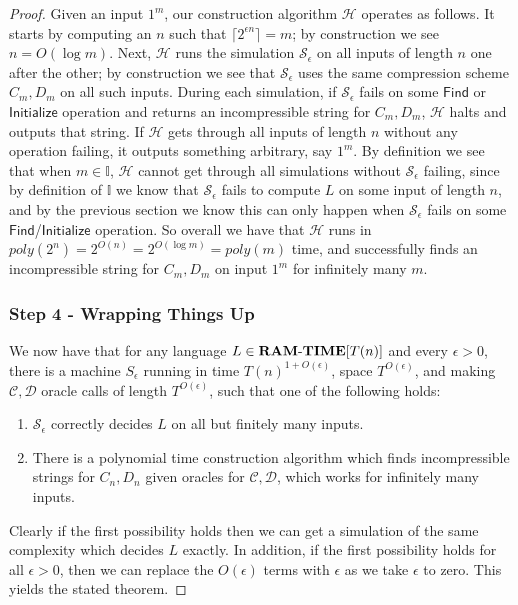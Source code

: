 \documentclass[11pt]{article}
\newcommand{\dash}{\text{-}}
\def\cl{\bf}
\begin{document}
\begin{proof}
Given an input $1^m$, our construction algorithm $\mathcal{H}$ operates as follows. It starts by computing an $n$ such that $\lceil 2^{\epsilon n} \rceil = m$; by construction we see $n = O(\log m)$. Next, $\mathcal{H}$ runs the simulation $\mathcal{S}_{\epsilon}$ on all inputs of length $n$ one after the other; by construction we see that $\mathcal{S}_{\epsilon}$ uses the same compression scheme $C_m,D_m$ on all such inputs. During each simulation, if $\mathcal{S}_{\epsilon}$ fails on some $\mathsf{Find}$ or $\mathsf{Initialize}$ operation and returns an incompressible string for $C_m,D_m$, $\mathcal{H}$ halts and outputs that string. If $\mathcal{H}$ gets through all inputs of length $n$ without any operation failing, it outputs something arbitrary, say $1^m$. By definition we see that when $m \in \mathbb{I}$, $\mathcal{H}$ cannot get through all simulations without $\mathcal{S}_{\epsilon}$ failing, since by definition of $\mathbb{I}$ we know that $\mathcal{S}_{\epsilon}$ fails to compute $L$ on some input of length $n$, and by the previous section we know this can only happen when $\mathcal{S}_{\epsilon}$ fails on some $\mathsf{Find}$/$\mathsf{Initialize}$ operation. So overall we have that $\mathcal{H}$ runs in $poly(2^n) = 2^{O(n)} = 2^{O(\log m)} = poly(m)$ time, and successfully finds an incompressible string for $C_m,D_m$ on input $1^m$ for infinitely many $m$.

\subsubsection*{Step 4 - Wrapping Things Up}
We now have that for any language $L \in {\cl RAM\dash TIME}[T(n)]$ and every $\epsilon > 0$, there is a machine $S_{\epsilon}$ running in time $T(n)^{1+O(\epsilon)}$, space $T^{O(\epsilon)}$, and making $\mathcal{C},\mathcal{D}$ oracle calls of length $T^{O(\epsilon)}$, such that one of the following holds:
\begin{enumerate}
    \item $\mathcal{S}_{\epsilon}$ correctly decides $L$ on all but finitely many inputs.
    \item There is a polynomial time construction algorithm which finds incompressible strings for $C_n,D_n$ given oracles for $\mathcal{C},\mathcal{D}$, which works for infinitely many inputs.
\end{enumerate}
Clearly if the first possibility  holds then we can get a simulation of the same complexity which decides $L$ exactly. In addition, if the first possibility holds for all $\epsilon > 0$, then we can replace the $O(\epsilon)$ terms with $\epsilon$ as we take $\epsilon$ to zero. This yields the stated theorem.
\end{proof}
\end{document}
